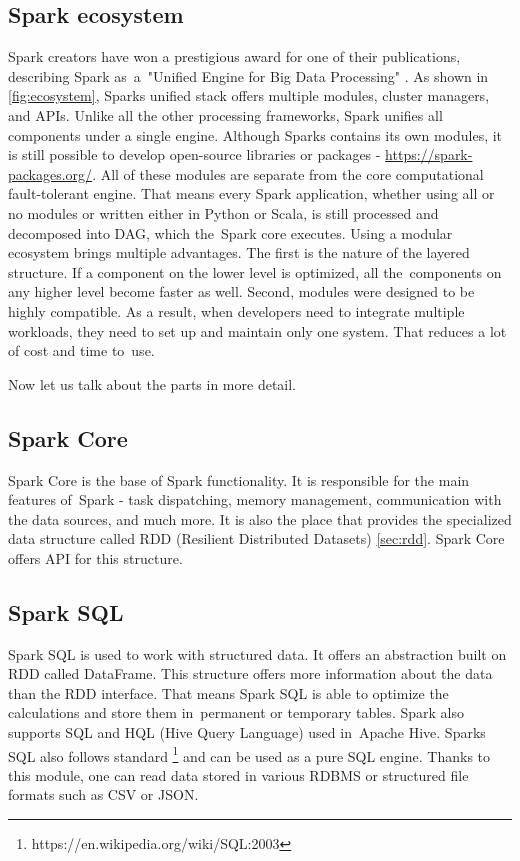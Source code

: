 \pagebreak

\subsection{Spark ecosystem}

Spark creators have won a prestigious award for one of their publications, describing Spark as~a~"Unified Engine for Big Data Processing" \cite{unified}. As shown in \ref{fig:ecosystem}, Sparks unified stack offers multiple modules, cluster managers, and APIs. Unlike all the other processing frameworks, Spark unifies all components under a single engine. Although Sparks contains its own modules, it is still possible to develop open-source libraries or packages - \url{https://spark-packages.org/}. All of these modules are separate from the core computational fault-tolerant engine. That means every Spark application, whether using all or no modules or written either in Python or Scala, is still processed and decomposed into DAG, which the~Spark core executes. 
Using a modular ecosystem brings multiple advantages. The first is the nature of the layered structure. If a component on the lower level is optimized, all the~components on any higher level become faster as well.
Second, modules were designed to be highly compatible. As a result, when developers need to integrate multiple workloads, they need to set up and maintain only one system. That reduces a lot of cost and time to~use.

Now let us talk about the parts in more detail.

\subsection*{Spark Core}


Spark Core is the base of Spark functionality. It is responsible for the main features of~Spark - task dispatching, memory management, communication with the data sources, and much more. It is also the place that provides the specialized data structure called RDD (Resilient Distributed Datasets) \ref{sec:rdd}.
Spark Core offers API for this structure.

\subsection*{Spark SQL}


Spark SQL is used to work with structured data. It offers an abstraction built on RDD called DataFrame. This structure offers more information about the data than the RDD interface.
That means Spark SQL is able to optimize the calculations and store them in~permanent or temporary tables. Spark also supports SQL and HQL (Hive Query Language) used in~Apache Hive. Sparks SQL also follows standard \footnote{https://en.wikipedia.org/wiki/SQL:2003} and can be used as a pure SQL engine.
Thanks to this module, one can read data stored in various RDBMS or structured file formats such as CSV or JSON.


